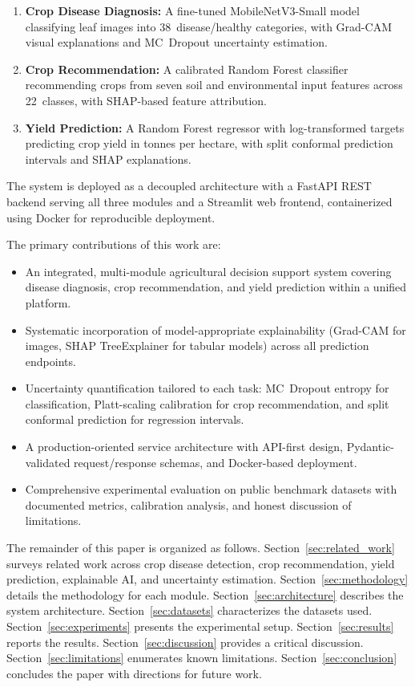 \documentclass[conference]{IEEEtran}
\begin{document}
\begin{enumerate}[leftmargin=*]
  \item \textbf{Crop Disease Diagnosis:} A fine-tuned MobileNetV3-Small model classifying leaf images into 38~disease/healthy categories, with Grad-CAM visual explanations and MC~Dropout uncertainty estimation.
  \item \textbf{Crop Recommendation:} A calibrated Random Forest classifier recommending crops from seven soil and environmental input features across 22~classes, with SHAP-based feature attribution.
  \item \textbf{Yield Prediction:} A Random Forest regressor with log-transformed targets predicting crop yield in tonnes per hectare, with split conformal prediction intervals and SHAP explanations.
\end{enumerate}

The system is deployed as a decoupled architecture with a FastAPI REST backend serving all three modules and a Streamlit web frontend, containerized using Docker for reproducible deployment.

The primary contributions of this work are:
\begin{itemize}[leftmargin=*]
  \item An integrated, multi-module agricultural decision support system covering disease diagnosis, crop recommendation, and yield prediction within a unified platform.
  \item Systematic incorporation of model-appropriate explainability (Grad-CAM for images, SHAP TreeExplainer for tabular models) across all prediction endpoints.
  \item Uncertainty quantification tailored to each task: MC~Dropout entropy for classification, Platt-scaling calibration for crop recommendation, and split conformal prediction for regression intervals.
  \item A production-oriented service architecture with API-first design, Pydantic-validated request/response schemas, and Docker-based deployment.
  \item Comprehensive experimental evaluation on public benchmark datasets with documented metrics, calibration analysis, and honest discussion of limitations.
\end{itemize}

The remainder of this paper is organized as follows. Section~\ref{sec:related_work} surveys related work across crop disease detection, crop recommendation, yield prediction, explainable AI, and uncertainty estimation. Section~\ref{sec:methodology} details the methodology for each module. Section~\ref{sec:architecture} describes the system architecture. Section~\ref{sec:datasets} characterizes the datasets used. Section~\ref{sec:experiments} presents the experimental setup. Section~\ref{sec:results} reports the results. Section~\ref{sec:discussion} provides a critical discussion. Section~\ref{sec:limitations} enumerates known limitations. Section~\ref{sec:conclusion} concludes the paper with directions for future work.
\end{document}

